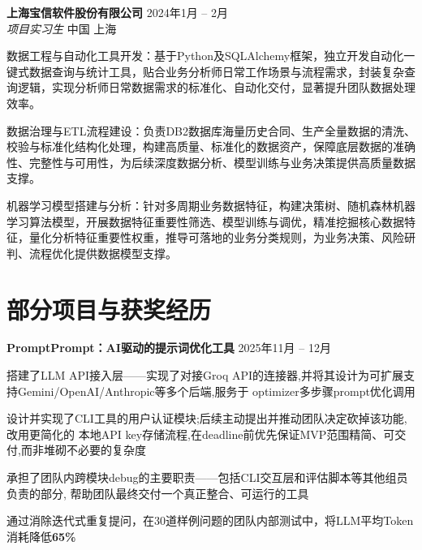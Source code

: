 \documentclass[11pt]{article}
\newcommand{\jobheader}[4]{%
  \vspace{1pt}%
  {\textbf{#1} \hfill #3} \\[-2pt]
  {\textit{#2} \hfill #4} \\[-4pt]
}
\newcommand{\projheader}[2]{%
  \vspace{1pt}%
  {\textbf{#1} \hfill #2} \\[-4pt]
}
\begin{document}
\vspace{1pt}

\jobheader{上海宝信软件股份有限公司}{项目实习生}{2024年1月 -- 2月}{中国 \quad 上海}
\begin{rbullet}
  \item 数据工程与自动化工具开发：基于Python及SQLAlchemy框架，独立开发自动化一键式数据查询与统计工具，贴合业务分析师日常工作场景与流程需求，封装复杂查询逻辑，实现分析师日常数据需求的标准化、自动化交付，显著提升团队数据处理效率。
  \item 数据治理与ETL流程建设：负责DB2数据库海量历史合同、生产全量数据的清洗、校验与标准化结构化处理，构建高质量、标准化的数据资产，保障底层数据的准确性、完整性与可用性，为后续深度数据分析、模型训练与业务决策提供高质量数据支撑。
  \item 机器学习模型搭建与分析：针对多周期业务数据特征，构建决策树、随机森林机器学习算法模型，开展数据特征重要性筛选、模型训练与调优，精准挖掘核心数据特征，量化分析特征重要性权重，推导可落地的业务分类规则，为业务决策、风险研判、流程优化提供数据模型支撑。
 \end{rbullet}


\section{部分项目与获奖经历}

\projheader{PromptPrompt：AI驱动的提示词优化工具}{2025年11月 -- 12月}
\begin{rbullet}
  \item 搭建了LLM API接入层——实现了对接Groq API的连接器,并将其设计为可扩展支持Gemini/OpenAI/Anthropic等多个后端,服务于
optimizer多步骤prompt优化调用
  \item 设计并实现了CLI工具的用户认证模块;后续主动提出并推动团队决定砍掉该功能,改用更简化的
本地API key存储流程,在deadline前优先保证MVP范围精简、可交付,而非堆砌不必要的复杂度
  \item 承担了团队内跨模块debug的主要职责——包括CLI交互层和评估脚本等其他组员负责的部分,
帮助团队最终交付一个真正整合、可运行的工具
  \item 通过消除迭代式重复提问，在30道样例问题的团队内部测试中，将LLM平均Token消耗降低\textbf{65\%}
\end{rbullet}

\vspace{1pt}
\end{document}
